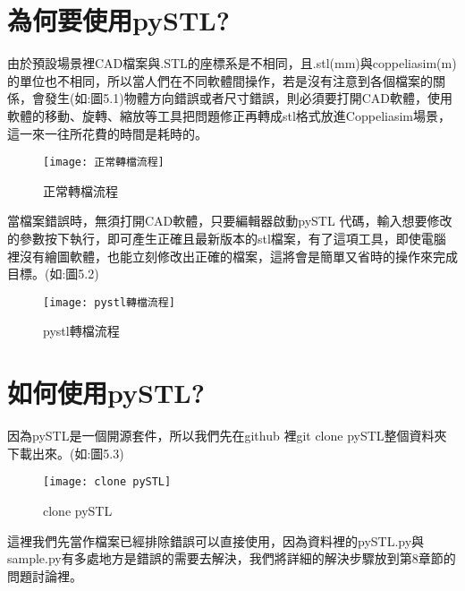 \section{為何要使用pySTL?}

由於預設場景裡CAD檔案與.STL的座標系是不相同，且.stl(mm)與coppeliasim(m) 的單位也不相同，所以當人們在不同軟體間操作，若是沒有注意到各個檔案的關係，會發生(如:圖5.1)物體方向錯誤或者尺寸錯誤，則必須要打開CAD軟體，使用軟體的移動、旋轉、縮放等工具把問題修正再轉成stl格式放進Coppeliasim場景，這一來一往所花費的時間是耗時的。\\

\begin{figure}[hbt!]
\begin{center}
\texttt{[image: 正常轉檔流程]}
\caption{\Large 正常轉檔流程}\label{正常轉檔流程}
\end{center}
\end{figure}

當檔案錯誤時，無須打開CAD軟體，只要編輯器啟動pySTL 代碼，輸入想要修改的參數按下執行，即可產生正確且最新版本的stl檔案，有了這項工具，即使電腦裡沒有繪圖軟體，也能立刻修改出正確的檔案，這將會是簡單又省時的操作來完成目標。(如:圖5.2)\\

\begin{figure}[hbt!]
\begin{center}
\texttt{[image: pystl轉檔流程]}
\caption{\Large pystl轉檔流程}\label{pystl轉檔流程}
\end{center}
\end{figure}

\section{如何使用pySTL?}
因為pySTL是一個開源套件，所以我們先在github 裡git clone pySTL整個資料夾下載出來。(如:圖5.3)\\

\begin{figure}[hbt!]
\begin{center}
\texttt{[image: clone pySTL]}
\caption{\Large clone pySTL}\label{clone pySTL}
\end{center}
\end{figure}

這裡我們先當作檔案已經排除錯誤可以直接使用，因為資料裡的pySTL.py與sample.py有多處地方是錯誤的需要去解決，我們將詳細的解決步驟放到第8章節的問題討論裡。\\

